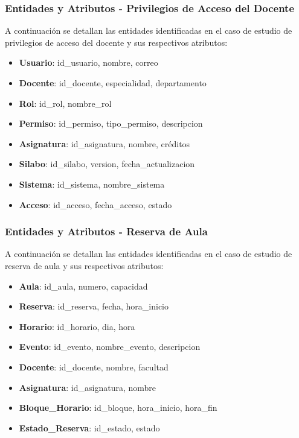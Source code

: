 \documentclass{article}
\begin{document}
\subsubsection{Entidades y Atributos - Privilegios de Acceso del Docente}

A continuación se detallan las entidades identificadas en el caso de estudio de privilegios de acceso del docente y sus respectivos atributos:

\begin{itemize}
    \item \textbf{Usuario}: id\_usuario, nombre, correo
    \item \textbf{Docente}: id\_docente, especialidad, departamento
    \item \textbf{Rol}: id\_rol, nombre\_rol
    \item \textbf{Permiso}: id\_permiso, tipo\_permiso, descripcion
    \item \textbf{Asignatura}: id\_asignatura, nombre, créditos
    \item \textbf{Silabo}: id\_silabo, version, fecha\_actualizacion
    \item \textbf{Sistema}: id\_sistema, nombre\_sistema
    \item \textbf{Acceso}: id\_acceso, fecha\_acceso, estado
\end{itemize}

\subsubsection{Entidades y Atributos - Reserva de Aula}

A continuación se detallan las entidades identificadas en el caso de estudio de reserva de aula y sus respectivos atributos:

\begin{itemize}
    \item \textbf{Aula}: id\_aula, numero, capacidad
    \item \textbf{Reserva}: id\_reserva, fecha, hora\_inicio
    \item \textbf{Horario}: id\_horario, dia, hora
    \item \textbf{Evento}: id\_evento, nombre\_evento, descripcion
    \item \textbf{Docente}: id\_docente, nombre, facultad
    \item \textbf{Asignatura}: id\_asignatura, nombre
    \item \textbf{Bloque\_Horario}: id\_bloque, hora\_inicio, hora\_fin
    \item \textbf{Estado\_Reserva}: id\_estado, estado
\end{itemize}
\end{document}
